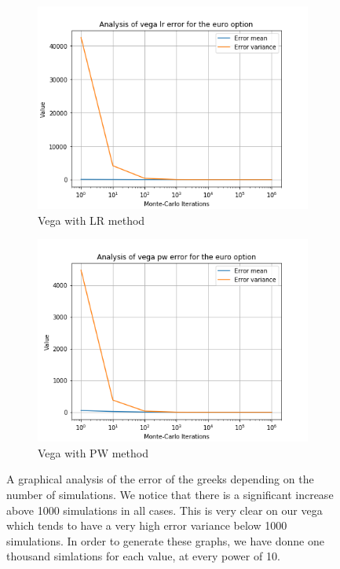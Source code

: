 \documentclass[11pt,a4paper,fleqn,draft]{article}
\begin{document}
\begin{figure}
      \begin{subfigure}[b]{0.45\textwidth}
          \includegraphics[width=\textwidth]{graphs/eurovegalr.png}
          \caption{Vega with LR method}
      \end{subfigure}
      \begin{subfigure}[b]{0.45\textwidth}
          \includegraphics[width=\textwidth]{graphs/eurovegapw.png}
          \caption{Vega with PW method}
      \end{subfigure}

      \caption{\label{fig:eurographs}A graphical analysis of the error of the greeks depending on the number of simulations. We notice that there is a significant increase above 1000 simulations in all cases. This is very clear on our vega which tends to have a very high error variance below 1000 simulations. In order to generate these graphs, we have donne one thousand simlations for each value, at every power of 10.}


\end{figure}
\end{document}
